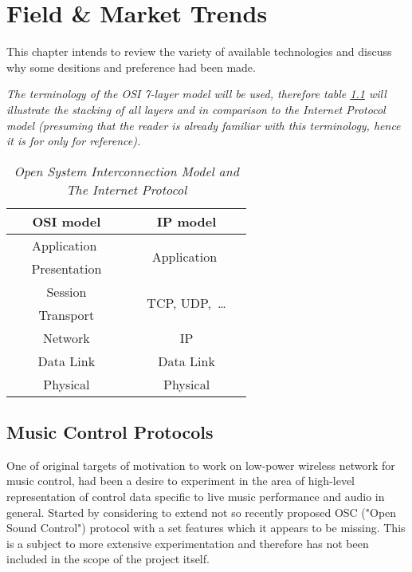 \chapter{Field \& Market Trends}

 This chapter intends to review the variety of available
 technologies and discuss why some desitions and preference
 had been made.

 \emph{The terminology of the OSI 7-layer model will be used,
 therefore table \ref{tab:osi} will illustrate the stacking
 of all layers and in comparison to the Internet Protocol
 model (presuming that the reader is already familiar with
 this terminology, hence it is for only for reference).}

\begin{table}[h]
\begin{center}
 \begin{tabular}{|c||c|}
 \hline
 {\bf OSI model}&{\bf IP model}\\
 \hline \hline
 \ \ \  Application \ \ \   & \multirow{2}{*}{ \ \ \   Application \ \ \ }   \\
 \cline{1-1}
 Presentation & \\
 \hline
 Session & \multirow{2}{*}{TCP, UDP,\  \dots }\\
 \cline{1-1}
 Transport & \\
 \hline
 Network & IP\\
 \hline
 Data Link & Data Link\\
 \hline
 Physical & Physical\\
 \hline
 \end{tabular}
 \end{center}
\caption{\emph{Open System Interconnection Model
	and The Internet Protocol}}\label{tab:osi}
\end{table}


\section{Music Control Protocols}

   One of original targets of motivation to work on low-power
  wireless network for music control, had been a desire to
  experiment in the area of high-level representation of control
  data specific to live music performance and audio in general.
  Started by considering to extend not so recently proposed OSC
  ("Open Sound Control") protocol \cite{paper:osc11} with a
  set features which it appears to be missing. This is a subject
  to more extensive experimentation and therefore has not been
  included in the scope of the project itself.

